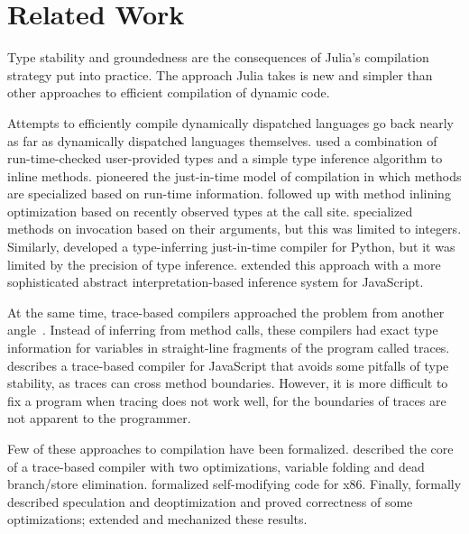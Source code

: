\documentclass[oneside,openright,titlepage,numbers=noenddot,%
headinclude,footinclude,cleardoublepage=empty,abstract=on,
BCOR=5mm,paper=a4,fontsize=11pt,
dvipsnames
]{scrreprt}
\begin{document}


\chapter{Related Work}%
\label{chap-related}

Type stability and groundedness are the consequences of Julia's compilation
strategy put into practice. The approach Julia takes is new and simpler than
other approaches to efficient compilation of dynamic code.

Attempts to efficiently compile dynamically dispatched languages go back nearly
as far as dynamically dispatched languages themselves.
\citet{HurricaneSmalltalk} used a combination of run-time-checked user-provided
types and a simple type inference algorithm to inline methods. \citet{CU89}
pioneered the just-in-time model of compilation in which methods are specialized
based on run-time information. \citet{holzle1994odd} followed up with method
inlining optimization based on recently observed types at the call site.
\citet{Psyco2004} specialized methods on invocation based on their arguments,
but this was limited to integers. Similarly, \citet{cannon2005localized} developed a
type-inferring just-in-time compiler for Python, but it was limited by the
precision of type inference. \citet{RATA} extended this approach with a more
sophisticated abstract interpretation-based inference system for JavaScript.

At the same time, trace-based compilers approached the problem from another
angle~\cite{chang2007efficient}.
Instead of inferring from method calls, these compilers had exact type
information for variables in straight-line fragments of the program called
traces. \citet{gal09} describes a trace-based compiler for JavaScript that avoids
some pitfalls of type stability, as traces can cross method boundaries.
However, it is more difficult to fix a program when tracing does not work well,
for the boundaries of traces are not apparent to the programmer.

Few of these approaches to compilation have been formalized.
\citet{CompilingWithTraces} described the core of a trace-based compiler with
two optimizations, variable folding and dead branch/store elimination.
\citet{VerifiedJITx86} formalized self-modifying code for x86. Finally,
\citet{popl18} formally described speculation and deoptimization and proved
correctness of some optimizations; \citet{oopsla21} extended and mechanized
these results.
\end{document}
